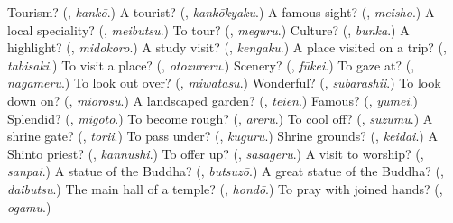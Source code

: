 \begin{tcolorbox}[breakable,colback=teal!4,colframe=teal!35!black,title={Before you move on}]
Tourism? (\textbf{}, \emph{kankō}.) A tourist? (\textbf{}, \emph{kankōkyaku}.) A famous sight? (\textbf{}, \emph{meisho}.) A local speciality? (\textbf{}, \emph{meibutsu}.) To tour? (\textbf{}, \emph{meguru}.) Culture? (\textbf{}, \emph{bunka}.) A highlight? (\textbf{}, \emph{midokoro}.) A study visit? (\textbf{}, \emph{kengaku}.) A place visited on a trip? (\textbf{}, \emph{tabisaki}.) To visit a place? (\textbf{}, \emph{otozureru}.) Scenery? (\textbf{}, \emph{fūkei}.) To gaze at? (\textbf{}, \emph{nagameru}.) To look out over? (\textbf{}, \emph{miwatasu}.) Wonderful? (\textbf{}, \emph{subarashii}.) To look down on? (\textbf{}, \emph{miorosu}.) A landscaped garden? (\textbf{}, \emph{teien}.) Famous? (\textbf{}, \emph{yūmei}.) Splendid? (\textbf{}, \emph{migoto}.) To become rough? (\textbf{}, \emph{areru}.) To cool off? (\textbf{}, \emph{suzumu}.) A shrine gate? (\textbf{}, \emph{torii}.) To pass under? (\textbf{}, \emph{kuguru}.) Shrine grounds? (\textbf{}, \emph{keidai}.) A Shinto priest? (\textbf{}, \emph{kannushi}.) To offer up? (\textbf{}, \emph{sasageru}.) A visit to worship? (\textbf{}, \emph{sanpai}.) A statue of the Buddha? (\textbf{}, \emph{butsuzō}.) A great statue of the Buddha? (\textbf{}, \emph{daibutsu}.) The main hall of a temple? (\textbf{}, \emph{hondō}.) To pray with joined hands? (\textbf{}, \emph{ogamu}.)
\end{tcolorbox}
